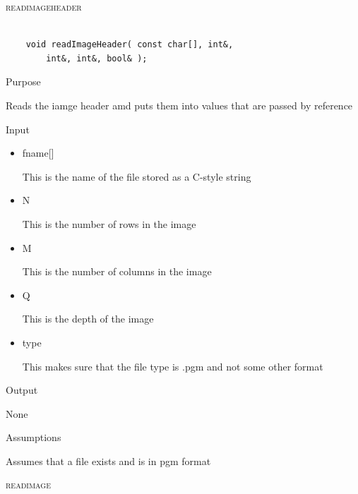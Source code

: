 \documentclass[pdftex, 11pt]{article}
\begin{document}
\begin{description}
	\item{\textsc{readimageheader}}

		\begin{lstlisting}

	void readImageHeader( const char[], int&, 
		int&, int&, bool& );
		\end{lstlisting}

		\begin{description}
			\item{Purpose}

				Reads the iamge header amd puts them into values that
				are passed by reference

			\item{Input}

				\begin{itemize}

					\item{fname[]}

						This is the name of the file stored
						as a C-style string

					\item{N}

						This is the number of rows in the image

					\item{M}

						This is the number of columns in
						the image

					\item{Q}

						This is the depth of the image

					\item{type}

						This makes sure that the file type is
						.pgm and not some other format
						
				\end{itemize}
						
						
			\item{Output}

				None

			\item{Assumptions}

				Assumes that a file exists and is in pgm format

		\end{description}


	\item{\textsc{readimage}}

		\begin{lstlisting}


\end{lstlisting}
\end{description}
\end{document}
